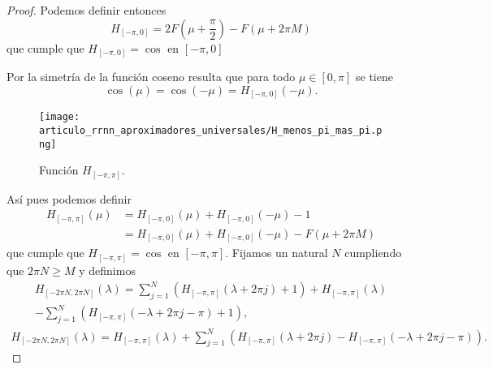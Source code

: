\begin{proof}
    Podemos definir entonces
    \begin{equation}
        H_{[-\pi, 0]} = 2 F \left(\mu + \frac{\pi}{2} \right)  - F(\mu + 2 \pi M) 
    \end{equation}
    que cumple que $H_{[-\pi, 0]} = \cos$ en $[-\pi,0]$

    Por la simetría de la función coseno resulta que 
    para todo $\mu \in [0, \pi]$ se tiene
    \begin{equation}
        \cos(\mu) = \cos(-\mu) = H_{[-\pi, 0]}(-\mu).
    \end{equation}
    \begin{figure}[h]
        \centering
        \texttt{[image: articulo\_rrnn\_aproximadores\_universales/H\_menos\_pi\_mas\_pi.png]}
        \caption{Función $H_{[-\pi, \pi]}$. }
        \label{fig:H_menos_pi_mas_pi}
    \end{figure}

    Así pues podemos definir 
    \begin{equation}
        \begin{split}
            H_{[-\pi, \pi ]}(\mu) &= H_{[-\pi, 0]}(\mu) + H_{[-\pi, 0]}(-\mu) - 1 \\
            &= H_{[-\pi, 0]}(\mu) + H_{[-\pi, 0]}(-\mu) - F(\mu + 2 \pi M) 
        \end{split} 
    \end{equation}  
    que cumple que $H_{[-\pi, \pi ]} = \cos$ en $[-\pi, \pi]$.
    Fijamos un natural $N$ cumpliendo que $2 \pi N \geq M$ 
    y definimos  
    \begin{equation}
    \begin{split}
        H_{[-2\pi N, 2 \pi N]} (\lambda) = 
        \sum_{j=1}^N (H_{[-\pi, \pi ]}(\lambda + 2 \pi j) +1) 
        + H_{[-\pi, \pi ]}(\lambda)  \\
        - \sum_{j=1}^N (H_{[-\pi, \pi ]}(- \lambda + 2 \pi j - \pi) +1),
    \end{split}
\end{equation}
\begin{equation}
    \begin{split}
        H_{[-2\pi N, 2 \pi N]} (\lambda) 
        =  H_{[-\pi, \pi ]}(\lambda) + 
        \sum_{j=1}^N (
            H_{[-\pi, \pi ]}(\lambda + 2 \pi j)
            - 
            H_{[-\pi, \pi ]}(- \lambda + 2 \pi j - \pi)
        ) .         
    \end{split}
    \end{equation}


\end{proof}
